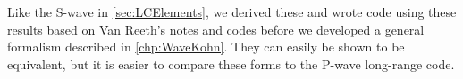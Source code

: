 \documentclass[Dissertation.tex]{subfiles}
\begin{document}
Like the S-wave in \cref{sec:LCElements}, we derived these and wrote code 
using these results based on Van Reeth's \cite{VanReethPrivate} notes and 
codes before we developed a general formalism described in \cref{chp:WaveKohn}.
They can easily be shown to be equivalent, but it is easier to compare these
forms to the P-wave long-range code.


%
%
\end{document}
